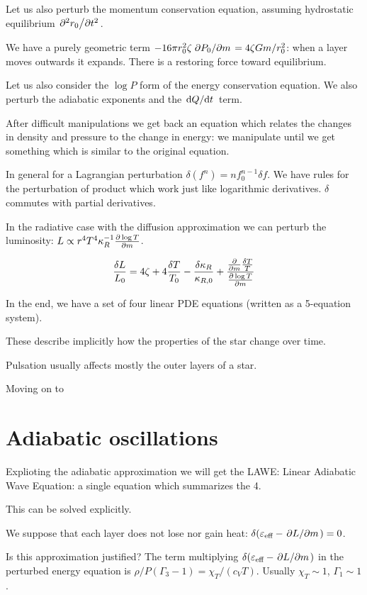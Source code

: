 \documentclass[main.tex]{subfiles}
\begin{document}
Let us also perturb the momentum conservation equation, assuming hydrostatic equilibrium \(\pdv*[2]{r_0}{t} \).

We have a purely geometric term \(-16 \pi r_0^2 \zeta \pdv*{P_0}{m} = 4 \zeta Gm /r_0^2\): when a layer moves outwards it expands.
There is a restoring force toward equilibrium.

Let us also consider the \(\log P\) form of the energy conservation equation.
We also perturb the adiabatic exponents and the \(\dv*{Q}{t} \) term.

After difficult manipulations we get back an equation which relates the changes in density and pressure to the change in energy: we manipulate until we get something which is similar to the original equation.

In general for a Lagrangian perturbation \(\delta (f^n) = n f_0^{n-1} \delta f\).
We have rules for the perturbation of product which work just like logarithmic derivatives. \(\delta\) commutes with partial derivatives.

In the radiative case with the diffusion approximation we can perturb the luminosity: \(L  \propto r^4 T^4 \kappa_R^{-1} \pdv{\log T}{m}\).

\begin{equation}
  \frac{\delta L}{L_0} = 4 \zeta + 4 \frac{\delta T}{T_0} - \frac{\delta \kappa_R}{\kappa_{R,0}} + \frac{\pdv{}{m}  \frac{\delta T}{T}}{\pdv{\log T}{m}}
\end{equation}

In the end, we have a set of four linear PDE equations (written as a 5-equation system).

These describe implicitly how the properties of the star change over time.

Pulsation usually affects mostly the outer layers of a star.

Moving on to

\section{Adiabatic oscillations}

Explioting the adiabatic approximation we will get the LAWE: Linear Adiabatic Wave Equation: a single equation which summarizes the 4.

This can be solved explicitly.

We suppose that each layer does not lose nor gain heat: \(\delta (\varepsilon_{\text{eff}} - \pdv*{L}{m} )=0\).

Is this approximation justified? The term multiplying \(\delta (\varepsilon_{\text{eff}} - \pdv*{L}{m} )\) in the perturbed energy equation is \(\rho/P (\Gamma_3-1) = \chi_T / (c_V T)\).
Usually \(\chi_T \sim 1\), \(\Gamma_1 \sim 1\).
\end{document}
